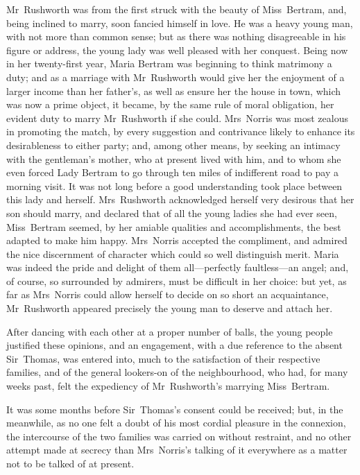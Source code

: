 Mr~Rushworth was from the first struck with the beauty of Miss~Bertram, and, being inclined to marry, soon fancied himself in love. He was a heavy young man, with not more than common sense; but as there was nothing disagreeable in his figure or address, the young lady was well pleased with her conquest. Being now in her twenty-first year, Maria Bertram was beginning to think matrimony a duty; and as a marriage with Mr~Rushworth would give her the enjoyment of a larger income than her father's, as well as ensure her the house in town, which was now a prime object, it became, by the same rule of moral obligation, her evident duty to marry Mr~Rushworth if she could. Mrs~Norris was most zealous in promoting the match, by every suggestion and contrivance likely to enhance its desirableness to either party; and, among other means, by seeking an intimacy with the gentleman's mother, who at present lived with him, and to whom she even forced Lady Bertram to go through ten miles of indifferent road to pay a morning visit. It was not long before a good understanding took place between this lady and herself. Mrs~Rushworth acknowledged herself very desirous that her son should marry, and declared that of all the young ladies she had ever seen, Miss~Bertram seemed, by her amiable qualities and accomplishments, the best adapted to make him happy. Mrs~Norris accepted the compliment, and admired the nice discernment of character which could so well distinguish merit. Maria was indeed the pride and delight of them all—perfectly faultless—an angel; and, of course, so surrounded by admirers, must be difficult in her choice: but yet, as far as Mrs~Norris could allow herself to decide on so short an acquaintance, Mr~Rushworth appeared precisely the young man to deserve and attach her.

After dancing with each other at a proper number of balls, the young people justified these opinions, and an engagement, with a due reference to the absent Sir~Thomas, was entered into, much to the satisfaction of their respective families, and of the general lookers-on of the neighbourhood, who had, for many weeks past, felt the expediency of Mr~Rushworth's marrying Miss~Bertram.

It was some months before Sir~Thomas's consent could be received; but, in the meanwhile, as no one felt a doubt of his most cordial pleasure in the connexion, the intercourse of the two families was carried on without restraint, and no other attempt made at secrecy than Mrs~Norris's talking of it everywhere as a matter not to be talked of at present.


